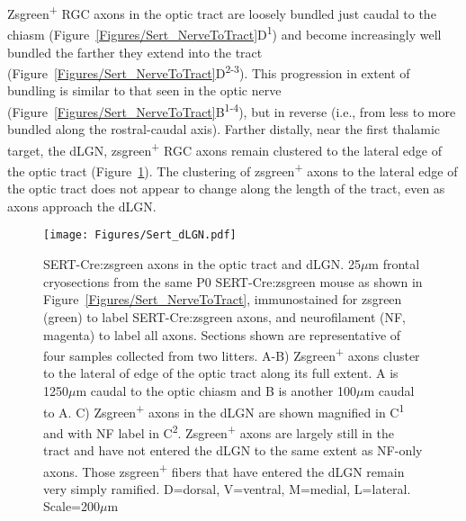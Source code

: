 Zsgreen\textsuperscript{+} RGC axons in the optic tract are loosely bundled just caudal to the chiasm (Figure~\ref{Figures/Sert_NerveToTract}D\textsuperscript{1}) and become increasingly well bundled the farther they extend into the tract (Figure~\ref{Figures/Sert_NerveToTract}D\textsuperscript{2-3}).
This progression in extent of bundling is similar to that seen in the optic nerve (Figure~\ref{Figures/Sert_NerveToTract}B\textsuperscript{1-4}), but in reverse (i.e., from less to more bundled along the rostral-caudal axis).
Farther distally, near the first thalamic target, the dLGN, zsgreen\textsuperscript{+} RGC axons remain clustered to the lateral edge of the optic tract (Figure~\ref{Figures/Sert_dLGN}).
The clustering of zsgreen\textsuperscript{+} axons to the lateral edge of the optic tract does not appear to change along the length of the tract, even as axons approach the dLGN.

\begin{figure}[hbtp]
	\begin{center}
		\texttt{[image: Figures/Sert\_dLGN.pdf]}
		\caption[SERT-Cre:zsgreen axons in the optic tract and dLGN.]
		{SERT-Cre:zsgreen axons in the optic tract and dLGN.
		25$\mu$m frontal cryosections from the same P0 SERT-Cre:zsgreen mouse as shown in Figure~\ref{Figures/Sert_NerveToTract}, immunostained for zsgreen (green) to label SERT-Cre:zsgreen axons, and neurofilament (NF, magenta) to label all axons.
		Sections shown are representative of four samples collected from two litters. %
		A-B) Zsgreen\textsuperscript{+} axons cluster to the lateral of edge of the optic tract along its full extent. 
		A is 1250$\mu$m caudal to the optic chiasm and B is another 100$\mu$m caudal to A.
		C) Zsgreen\textsuperscript{+} axons in the dLGN are shown magnified in C\textsuperscript{1} and with NF label in C\textsuperscript{2}.
		Zsgreen\textsuperscript{+} axons are largely still in the tract and have not entered the dLGN to the same extent as NF-only axons.
		Those zsgreen\textsuperscript{+} fibers that have entered the dLGN remain very simply ramified.
		D=dorsal, V=ventral, M=medial, L=lateral. Scale=200$\mu$m}
		\label{Figures/Sert_dLGN}
	\end{center}
\end{figure}